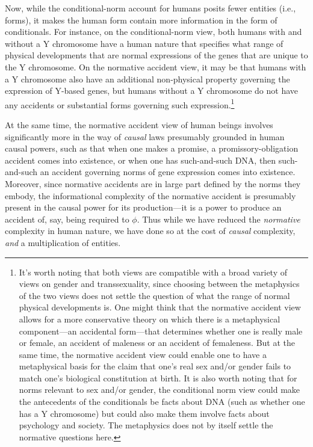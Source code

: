 Now, while the conditional-norm account for humans
posits fewer entities (i.e., forms), it makes the human form contain more information in the form of conditionals.
For instance, on the conditional-norm view, both humans with and without a Y chromosome have a human nature that specifies what
range of physical developments that are normal expressions of the genes that are unique to the Y chromosome. On the 
normative accident view, it may be that humans with a Y chromosome also have an additional non-physical property governing
the expression of Y-based genes, but humans without a Y chromosome do not have any accidents or substantial forms
governing such expression.\footnote{It's worth noting that both views are compatible with a broad variety of views on gender and 
transsexuality, since choosing between the metaphysics of the two views does not settle the question of what the range
of normal physical developments is. One might think that the normative accident view allows for a more conservative
theory on which there is a metaphysical component---an accidental form---that determines whether one is really male or female, 
an accident of maleness or an accident of femaleness.  But at the same time, the normative accident view could enable one to have 
a metaphysical basis for the claim that one's real sex and/or gender fails to match one's biological constitution at birth.
It is also worth noting that for norms relevant to sex and/or gender, the conditional norm view could make the antecedents 
of the conditionals be facts about DNA (such as whether one has a Y chromosome) but could also make them involve facts about 
psychology and society. The metaphysics does not by itself settle the normative questions here.}

At the same time, the normative accident view of human beings involves significantly more in the way of \textit{causal} laws
presumably grounded in human causal powers, such as that when one makes a promise, a promissory-obligation
accident comes into existence, or when one has such-and-such DNA, then such-and-such an accident governing norms of gene expression
comes into existence. Moreover, since normative accidents are in large part defined by the norms they embody, the informational
complexity of the normative accident is presumably present in the causal power for its production---it is a power to produce an
accident of, say, being required to $\phi$.  Thus while we have reduced the \textit{normative} complexity in human nature, we have done 
so at the cost of \textit{causal} complexity, \textit{and} a multiplication of entities.

